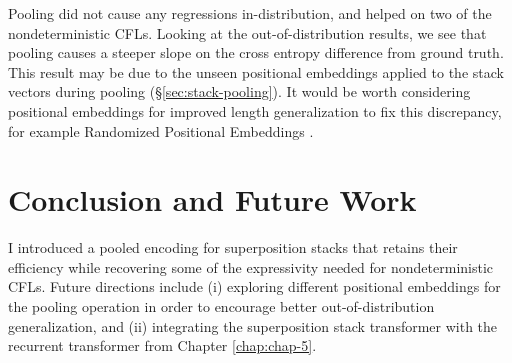 Pooling did not cause any regressions in-distribution, and helped on two of the nondeterministic CFLs. Looking at the out-of-distribution results, we see that pooling causes a steeper slope on the cross entropy difference from ground truth. This result may be due to the unseen positional embeddings applied to the stack vectors during pooling (\S \ref{sec:stack-pooling}). It would be worth considering positional embeddings for improved length generalization to fix this discrepancy, for example Randomized Positional Embeddings \citep{ruoss_randomized_2023}.

\section{Conclusion and Future Work}
I introduced a pooled encoding for superposition stacks that retains their efficiency while recovering some of the expressivity needed for nondeterministic CFLs.  Future directions include (i) exploring different positional embeddings for the pooling operation in order to encourage better out-of-distribution generalization, and (ii) integrating the superposition stack transformer with the recurrent transformer from Chapter \ref{chap:chap-5}.